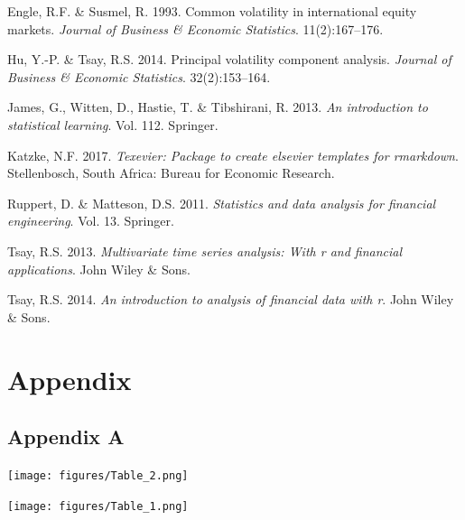 \documentclass[11pt,preprint, authoryear]{elsarticle}
\let\origfigure\figure
\let\endorigfigure\endfigure
\renewenvironment{figure}[1][2] {
    \expandafter\origfigure\expandafter[H]
} {
    \endorigfigure
}
\numberwithin{equation}{section}
\numberwithin{figure}{section}
\numberwithin{table}{section}
\newlength{\cslhangindent}
\newenvironment{CSLReferences}%
  {\setlength{\parindent}{0pt}%
  \everypar{\setlength{\hangindent}{\cslhangindent}}\ignorespaces}%
  {\par}
\begin{document}
\hypertarget{refs}{}
\begin{CSLReferences}{1}{0}
\leavevmode\hypertarget{ref-engle}{}%
Engle, R.F. \& Susmel, R. 1993. Common volatility in international
equity markets. \emph{Journal of Business \& Economic Statistics}.
11(2):167--176.

\leavevmode\hypertarget{ref-hu}{}%
Hu, Y.-P. \& Tsay, R.S. 2014. Principal volatility component analysis.
\emph{Journal of Business \& Economic Statistics}. 32(2):153--164.

\leavevmode\hypertarget{ref-ISLR}{}%
James, G., Witten, D., Hastie, T. \& Tibshirani, R. 2013. \emph{An
introduction to statistical learning}. Vol. 112. Springer.

\leavevmode\hypertarget{ref-Texevier}{}%
Katzke, N.F. 2017. \emph{{Texevier}: {P}ackage to create elsevier
templates for rmarkdown}. Stellenbosch, South Africa: Bureau for
Economic Research.

\leavevmode\hypertarget{ref-ruppert}{}%
Ruppert, D. \& Matteson, D.S. 2011. \emph{Statistics and data analysis
for financial engineering}. Vol. 13. Springer.

\leavevmode\hypertarget{ref-tsay2}{}%
Tsay, R.S. 2013. \emph{Multivariate time series analysis: With r and
financial applications}. John Wiley \& Sons.

\leavevmode\hypertarget{ref-tsay}{}%
Tsay, R.S. 2014. \emph{An introduction to analysis of financial data
with r}. John Wiley \& Sons.

\end{CSLReferences}

\newpage

\hypertarget{appendix}{%
\section*{Appendix}\label{appendix}}

\hypertarget{appendix-a}{%
\subsection*{Appendix A}\label{appendix-a}}

\begin{figure}[!htb]
\centering
\texttt{[image: figures/Table\_2.png]}
\caption{Eigenvectors of PCAs}\label{Appendix_1}
\end{figure}

\begin{figure}[!htb]
\centering
\texttt{[image: figures/Table\_1.png]}
\caption{Eigenvectors of PVCA}\label{Table_3}
\end{figure}


\end{document}

